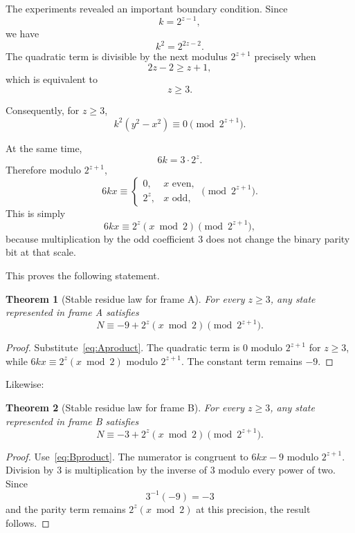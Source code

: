 \documentclass[11pt,a4paper]{article}
\newtheorem{theorem}{Theorem}
\theoremstyle{definition}
\theoremstyle{remark}
\begin{document}
The experiments revealed an important boundary condition. Since
\[
k=2^{z-1},
\]
we have
\[
k^2=2^{2z-2}.
\]
The quadratic term is divisible by the next modulus $2^{z+1}$ precisely when
\[
2z-2\ge z+1,
\]
which is equivalent to
\begin{equation}
 z\ge3.
\end{equation}

Consequently, for $z\ge3$,
\begin{equation}
 k^2(y^2-x^2)\equiv0\pmod{2^{z+1}}.
\end{equation}

At the same time,
\[
6k=3\cdot2^z.
\]
Therefore modulo $2^{z+1}$,
\begin{equation}
6kx
\equiv
\begin{cases}
0,&x\text{ even},\\
2^z,&x\text{ odd},
\end{cases}
\pmod{2^{z+1}}.
\end{equation}
This is simply
\begin{equation}
6kx\equiv2^z(x\bmod2)\pmod{2^{z+1}},
\end{equation}
because multiplication by the odd coefficient $3$ does not change the binary parity bit at that scale.

This proves the following statement.

\begin{theorem}[Stable residue law for frame A]
For every $z\ge3$, any state represented in frame A satisfies
\begin{equation}
N\equiv -9+2^z(x\bmod2)
\pmod{2^{z+1}}.
\label{eq:Alaw}
\end{equation}
\end{theorem}

\begin{proof}
Substitute~\eqref{eq:Aproduct}. The quadratic term is $0$ modulo $2^{z+1}$ for $z\ge3$, while $6kx\equiv2^z(x\bmod2)$ modulo $2^{z+1}$. The constant term remains $-9$.
\end{proof}

Likewise:

\begin{theorem}[Stable residue law for frame B]
For every $z\ge3$, any state represented in frame B satisfies
\begin{equation}
N\equiv -3+2^z(x\bmod2)
\pmod{2^{z+1}}.
\label{eq:Blaw}
\end{equation}
\end{theorem}

\begin{proof}
Use~\eqref{eq:Bproduct}. The numerator is congruent to $6kx-9$ modulo $2^{z+1}$. Division by $3$ is multiplication by the inverse of $3$ modulo every power of two. Since
\[
3^{-1}(-9)=-3
\]
and the parity term remains $2^z(x\bmod2)$ at this precision, the result follows.
\end{proof}
\end{document}
